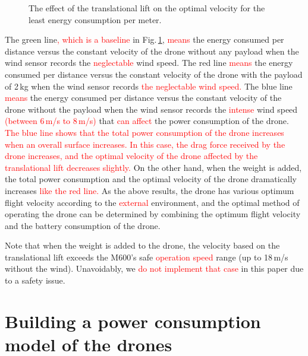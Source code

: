 \documentclass[journal]{./template/IEEEtran}
\begin{document}
\begin{figure}[ht]
\caption{The effect of the translational lift on the optimal velocity for the least energy consumption per meter.}
\label{fig: lift}
\end{figure}


The green line\textcolor{red}{, which is a baseline} in Fig.\,\ref{fig: lift}, \textcolor{red}{means} the energy consumed per distance versus the constant velocity of the drone without any payload when the wind sensor records the \textcolor{red}{neglectable} wind speed.
The red line \textcolor{red}{means} the energy consumed per distance versus the constant velocity of the drone with the payload of 2\,kg when the wind sensor records \textcolor{red}{the neglectable wind speed.}
The blue line \textcolor{red}{means} the energy consumed per distance versus the constant velocity of the drone without the payload when the wind sensor records the \textcolor{red}{intense} wind speed \textcolor{red}{(between 6\,m/s to 8\,m/s)} that \textcolor{red}{can affect} the power consumption of the drone.
\textcolor{red}{The blue line shows that the total power consumption of the drone increases when an overall surface increases. In this case, the drag force received by the drone increases, and the optimal velocity of the drone affected by the translational lift decreases slightly.}
On the other hand, when the weight is added, the total power consumption and the optimal velocity of the drone dramatically increases \textcolor{red}{like the red line.}
As the above results, the drone has various optimum flight velocity according to the \textcolor{red}{external} environment, and the optimal method of operating the drone can be determined by combining the optimum flight velocity and the battery consumption of the drone.

Note that when the weight is added to the drone, the velocity based on the translational lift exceeds the M600's safe \textcolor{red}{operation speed} range (up to 18\,m/s without the wind). Unavoidably, we \textcolor{red}{do not implement that case} in this paper due to a safety issue.








\section{Building a power consumption model of the drones}
\label{Section: Power consumption model for the drones}
\end{document}
